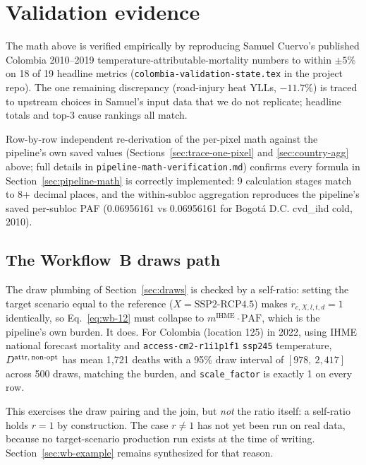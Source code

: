 \documentclass[11pt]{article}
\newcommand{\PAF}{\text{PAF}}
\newcommand{\SSPtwo}{\text{SSP2{-}RCP4.5}}
\newcommand{\mIHME}{m^{\text{IHME}}}
\begin{document}
\section{Validation evidence}
\label{sec:validation}

The math above is verified empirically by reproducing Samuel Cuervo's
published Colombia 2010--2019 temperature-attributable-mortality numbers
to within $\pm 5\%$ on 18 of 19 headline metrics (\texttt{colombia-validation-state.tex} in the project repo). The one remaining discrepancy
(road-injury heat YLLs, $-11.7\%$) is traced to upstream choices in
Samuel's input data that we do not replicate; headline totals and top-3
cause rankings all match.

Row-by-row independent re-derivation of the per-pixel math against the
pipeline's own saved values (Sections~\ref{sec:trace-one-pixel} and
\ref{sec:country-agg} above; full details in
\texttt{pipeline-math-verification.md}) confirms every formula in
Section~\ref{sec:pipeline-math} is correctly implemented: 9 calculation
stages match to 8+ decimal places, and the within-subloc aggregation
reproduces the pipeline's saved per-subloc PAF (0.06956161 vs 0.06956161
for Bogotá D.C. cvd\_ihd cold, 2010).

\subsection*{The Workflow~B draws path}

The draw plumbing of Section~\ref{sec:draws} is checked by a self-ratio:
setting the target scenario equal to the reference ($X = \SSPtwo$) makes
$r_{c,X,l,t,d} = 1$ identically, so Eq.~\eqref{eq:wb-12} must collapse to
$\mIHME \cdot \PAF$, which is the pipeline's own burden. It does. For
Colombia (location 125) in 2022, using IHME national forecast mortality
and \texttt{access-cm2-r1i1p1f1} \texttt{ssp245} temperature,
$\mAttr[non-opt]$ has mean 1{,}721 deaths with a 95\% draw
interval of $[978,\ 2{,}417]$ across 500 draws, matching the burden, and
\texttt{scale\_factor} is exactly 1 on every row.

This exercises the draw pairing and the join, but \emph{not} the ratio
itself: a self-ratio holds $r = 1$ by construction. The case $r \neq 1$
has not yet been run on real data, because no target-scenario production
run exists at the time of writing. Section~\ref{sec:wb-example} remains
synthesized for that reason.
\end{document}
